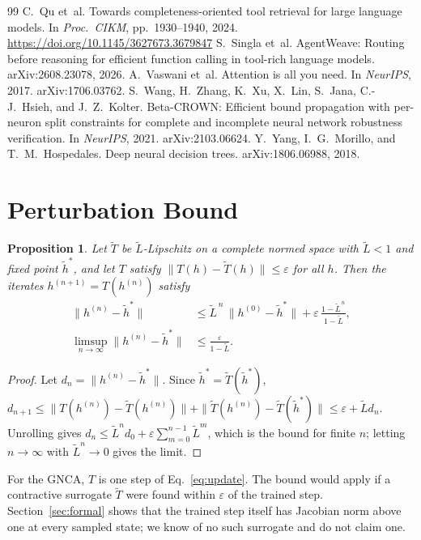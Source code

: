 \documentclass[10pt]{article}
\newtheorem{proposition}{Proposition}
\begin{document}
\begin{thebibliography}{99}
 C.~Qu et~al. Towards completeness-oriented tool retrieval for large language models. In \emph{Proc.\ CIKM}, pp.~1930--1940, 2024. \url{https://doi.org/10.1145/3627673.3679847}
 S.~Singla et~al. AgentWeave: Routing before reasoning for efficient function calling in tool-rich language models. arXiv:2608.23078, 2026.
 A.~Vaswani et~al. Attention is all you need. In \emph{NeurIPS}, 2017. arXiv:1706.03762.
 S.~Wang, H.~Zhang, K.~Xu, X.~Lin, S.~Jana, C.-J.~Hsieh, and J.~Z.~Kolter. Beta-CROWN: Efficient bound propagation with per-neuron split constraints for complete and incomplete neural network robustness verification. In \emph{NeurIPS}, 2021. arXiv:2103.06624.
 Y.~Yang, I.~G.~Morillo, and T.~M.~Hospedales. Deep neural decision trees. arXiv:1806.06988, 2018.
\end{thebibliography}

\appendix
\section{Perturbation Bound}\label{app:ostrowski}
\begin{proposition}\label{prop:perturbation}
Let $\tilde T$ be $\tilde L$-Lipschitz on a complete normed space with $\tilde L<1$ and fixed point $\tilde h^\ast$, and let $T$ satisfy $\|T(h)-\tilde T(h)\|\le\varepsilon$ for all $h$. Then the iterates $h^{(n+1)} = T(h^{(n)})$ satisfy
\begin{align*}
\|h^{(n)}-\tilde h^\ast\| &\le \tilde L^{\,n}\,\|h^{(0)}-\tilde h^\ast\| + \varepsilon\,\frac{1-\tilde L^{\,n}}{1-\tilde L},\\
\limsup_{n\to\infty}\|h^{(n)}-\tilde h^\ast\| &\le \frac{\varepsilon}{1-\tilde L}.
\end{align*}
\end{proposition}
\begin{proof}
Let $d_n = \|h^{(n)}-\tilde h^\ast\|$. Since $\tilde h^\ast = \tilde T(\tilde h^\ast)$,
$d_{n+1} \le \|T(h^{(n)}) - \tilde T(h^{(n)})\| + \|\tilde T(h^{(n)}) - \tilde T(\tilde h^\ast)\| \le \varepsilon + \tilde L d_n$.
Unrolling gives $d_n \le \tilde L^n d_0 + \varepsilon\sum_{m=0}^{n-1}\tilde L^m$, which is the bound for finite $n$; letting $n\to\infty$ with $\tilde L^n\to0$ gives the limit.
\end{proof}
For the GNCA, $T$ is one step of Eq.~\eqref{eq:update}. The bound would apply if a contractive surrogate $\tilde T$ were found within $\varepsilon$ of the trained step. Section~\ref{sec:formal} shows that the trained step itself has Jacobian norm above one at every sampled state; we know of no such surrogate and do not claim one.
\end{document}
